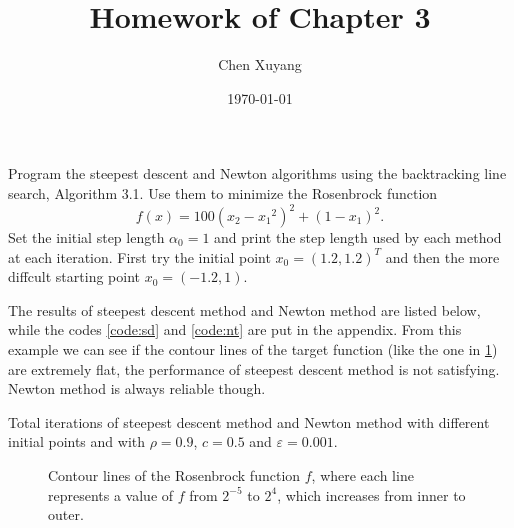 \documentclass{assignment}[2019/09/15]
\title{Homework of Chapter 3}
\author{Chen Xuyang}
\date{\today}
\institute{School of Mathematical Science}
\begin{document}
    \maketitle

    \begin{problem}\label{prob:sd}
        Program the steepest descent and Newton algorithms using the backtracking line search, Algorithm 3.1. Use them to minimize the Rosenbrock function
        \begin{equation}
            f(x) = 100(x_2-{x_1}^2)^2+(1-x_1)^2.
        \end{equation}
        Set the initial step length $\alpha_0=1$ and print the step length used by each method at each iteration. First try the initial point $x_0=(1.2, 1.2)^T$ and then the more diffcult starting point $x_0=(-1.2, 1)$.
    \end{problem}
    \begin{solution}
        The results of steepest descent method and Newton method are listed below, while the codes \ref{code:sd} and \ref{code:nt} are put in the appendix. From this example we can see if the contour lines of the target function (like the one in \ref{fig:rosenbrock}) are extremely flat, the performance of steepest descent method is not satisfying. Newton method is always reliable though.
        \begin{table}[htb]
            \begin{center}
                \caption{Total iterations of steepest descent method and Newton method with different initial points and with $\rho=0.9$, $c=0.5$ and $\varepsilon=0.001$.}
            \end{center}
        \end{table}
        \begin{figure}[htb]
            \centering
            
            \caption{Contour lines of the Rosenbrock function $f$, where each line represents a value of $f$ from $2^{-5}$ to $2^4$, which increases from inner to outer.}
            \label{fig:rosenbrock}
        \end{figure}
    \end{solution}
\end{document}
